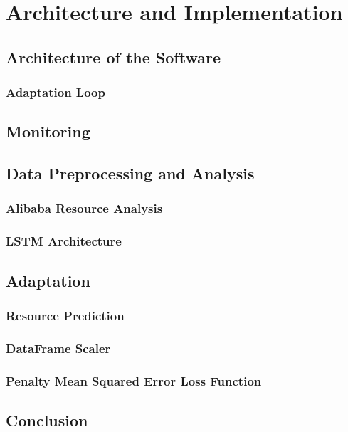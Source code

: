 \chapter{Architecture and Implementation}

\section{Architecture of the Software}

  \subsection{Adaptation Loop}

\section{Monitoring}

\section{Data Preprocessing and Analysis}

  \subsection{Alibaba Resource Analysis}
  \subsection{LSTM Architecture}

\section{Adaptation}
  \subsection{Resource Prediction}
  \subsection{DataFrame Scaler}
  \subsection{Penalty Mean Squared Error Loss Function}
\section{Conclusion}